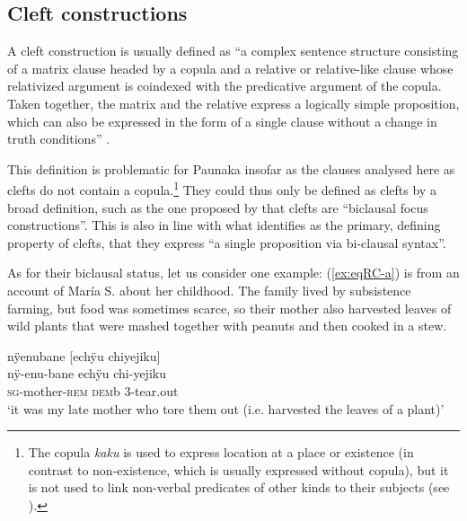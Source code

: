 \subsection{Cleft constructions}\label{sec:Clefts}

A cleft construction is usually defined as “a complex sentence structure consisting of a matrix clause headed by a copula and a relative or relative-like clause whose relativized argument is coindexed with the predicative argument of the copula. Taken together, the matrix and the relative express a logically simple proposition, which can also be expressed in the form of a single clause without a change in truth conditions” \citep[467]{Lambrecht2001}.

This definition is problematic for Paunaka insofar as the clauses analysed here as clefts do not contain a copula.\footnote{The copula \textit{kaku} is used to express location at a place or existence (in contrast to non-existence, which is usually expressed without copula), but it is not used to link non-verbal predicates of other kinds to their subjects (see ).} They could thus only be defined as clefts by a broad definition, such as the one proposed by \citet[1]{PalancarVanhove2020} that clefts are “biclausal focus constructions”. This is also in line with what \citet[463]{Lambrecht2001} identifies as the primary, defining property of clefts, that they express “a single proposition via bi-clausal syntax”.

As for their biclausal status, let us consider one example: (\ref{ex:eqRC-a}) is from an account of María S. about her childhood. The family lived by subsistence farming, but food was sometimes scarce, so their mother also harvested leaves of wild plants that were mashed together with peanuts and then cooked in a stew.

\ea\label{ex:eqRC-a}
\begingl
\glpreamble nÿenubane \textup{[}echÿu chiyejiku\textup{]}\\
\gla nÿ-enu-bane echÿu chi-yejiku\\
\textsc{sg}-mother-\textsc{rem} \textsc{dem}b 3-tear.out\\
\glft ‘it was my late mother who tore them out (i.e. harvested the leaves of a plant)’
\endgl
\trailingcitation{[rxx-p181101l-2.241]}
\xe

